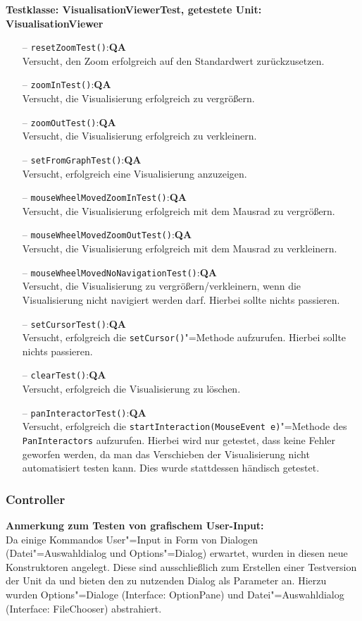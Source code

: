 \documentclass[parskip=full,11pt,twoside]{scrartcl}
\def\qa{\hfill\textbf{QA}}
\begin{document}
\textbf{Testklasse: VisualisationViewerTest, getestete Unit: VisualisationViewer}
\begin{itemize}
	\item[--] \texttt{resetZoomTest()}:\qa\\
	Versucht, den Zoom erfolgreich auf den Standardwert zurückzusetzen.
	\item[--] \texttt{zoomInTest()}:\qa\\
	Versucht, die Visualisierung erfolgreich zu vergrößern.
	\item[--] \texttt{zoomOutTest()}:\qa\\
	Versucht, die Visualisierung erfolgreich zu verkleinern.
	\item[--] \texttt{setFromGraphTest()}:\qa\\
	Versucht, erfolgreich eine Visualisierung anzuzeigen.
	\item[--] \texttt{mouseWheelMovedZoomInTest()}:\qa\\
	Versucht, die Visualisierung erfolgreich mit dem Mausrad zu vergrößern.
	\item[--] \texttt{mouseWheelMovedZoomOutTest()}:\qa\\
	Versucht, die Visualisierung erfolgreich mit dem Mausrad zu verkleinern.
	\item[--] \texttt{mouseWheelMovedNoNavigationTest()}:\qa\\
	Versucht, die Visualisierung zu vergrößern/verkleinern, wenn die Visualisierung nicht navigiert werden darf. Hierbei sollte nichts passieren.
	\item[--] \texttt{setCursorTest()}:\qa\\
	Versucht, erfolgreich die \texttt{setCursor()}"=Methode aufzurufen. Hierbei sollte nichts passieren.
	\item[--] \texttt{clearTest()}:\qa\\
	Versucht, erfolgreich die Visualisierung zu löschen.
	\item[--] \texttt{panInteractorTest()}:\qa\\
	Versucht, erfolgreich die \texttt{startInteraction(MouseEvent e)}"=Methode des\\\texttt{PanInteractors} aufzurufen. Hierbei wird nur getestet, dass keine Fehler geworfen werden, da man das Verschieben der Visualisierung nicht automatisiert testen kann. Dies wurde stattdessen händisch getestet.
\end{itemize}

\subsubsection{Controller}
\textbf{Anmerkung zum Testen von grafischem User-Input:}\\
Da einige Kommandos User"=Input in Form von Dialogen (Datei"=Auswahldialog und Options"=Dialog) erwartet, wurden in diesen neue Konstruktoren angelegt. Diese sind ausschließlich zum Erstellen einer Testversion der Unit da und bieten den zu nutzenden Dialog als Parameter an. Hierzu wurden Options"=Dialoge (Interface: OptionPane) und Datei"=Auswahldialog (Interface: FileChooser) abstrahiert.
\end{document}
